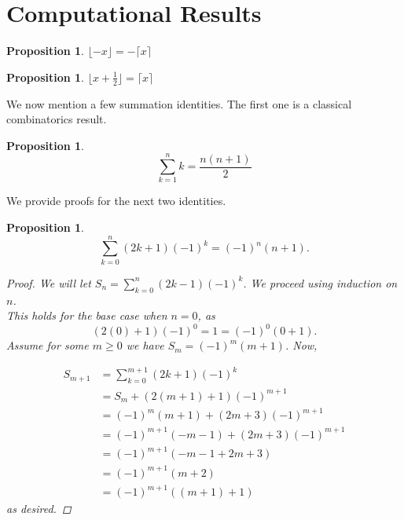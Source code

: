 \documentclass[11pt]{amsart}
\numberwithin{equation}{section}
\theoremstyle{plain}
\newtheorem{proposition}[equation]{Proposition}
\theoremstyle{definition}
\begin{document}
\section{Computational Results}

\begin{proposition}\label{prop:neg_ceil_floor}
  $\lfloor -x\rfloor=-\lceil x\rceil$
\end{proposition}

\begin{proposition}\label{prop:floor2ceil}
  $\lfloor x + \frac{1}{2}\rfloor=\lceil x\rceil $
\end{proposition}


We now mention a few summation identities. The first one is a classical combinatorics result. 

\begin{proposition}\label{prop:triangle}
$$\sum_{k=1}^n k = \frac{n(n+1)}{2}$$
\end{proposition}

We provide proofs for the next two identities.

\begin{proposition}\label{prop:alt_odd}
 $$\sum_{k=0}^n (2k+1)(-1)^k=(-1)^n(n+1).$$
\begin{proof}
We will let $\displaystyle S_n=\sum_{k=0}^n(2k-1)(-1)^k$.
We proceed using induction on $n$. \\This holds for the base case when $n=0$, as
$$(2(0)+1)(-1)^0=1=(-1)^0(0+1).$$
Assume for some $m\geq 0$ we have $S_m=(-1)^m(m+1)$. Now,

\begin{align*}
S_{m+1} &= \sum_{k=0}^{m+1}(2k+1)(-1)^k
\\&=S_m+ (2(m+1)+1)(-1)^{m+1}\\
&= (-1)^m(m+1) + (2m+3)(-1)^{m+1}\\
&= (-1)^{m+1}(-m-1)+(2m+3)(-1)^{m+1}\\
&= (-1)^{m+1}(-m-1+2m+3)\\
&= (-1)^{m+1}(m+2)\\
&= (-1)^{m+1}((m+1)+1)
\end{align*}
as desired. \end{proof}

\end{proposition}
\end{document}
